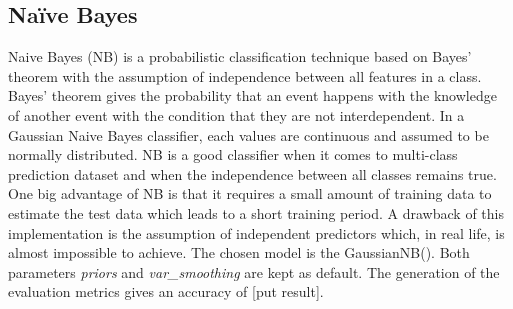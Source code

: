 \documentclass[11pt]{article}
\begin{document}
	\subsection{Naïve Bayes}
	Naive Bayes (NB) is a probabilistic classification technique based on Bayes’ theorem with the assumption of independence between all features in a class. Bayes’ theorem gives the probability that an event happens with the knowledge of another event with the condition that they are not interdependent. In a Gaussian Naive Bayes classifier, each values are continuous and assumed to be normally distributed.
	\medbreak
	NB is a good classifier when it comes to multi-class prediction dataset and when the independence between all classes remains true. One big advantage of NB is that it requires a small amount of training data to estimate the test data which leads to a short training period. A drawback of this implementation is the assumption of independent predictors which, in real life, is almost impossible to achieve. 
	\medbreak
	The chosen model is the GaussianNB(). Both parameters \textit{priors} and \textit{var\_smoothing} are kept as default. The generation of the evaluation metrics gives an accuracy of [put result].

	
\end{document}
